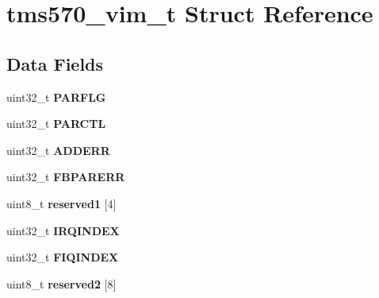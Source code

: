 \hypertarget{structtms570__vim__t}{}\section{tms570\+\_\+vim\+\_\+t Struct Reference}
\label{structtms570__vim__t}
\subsection*{Data Fields}
\begin{DoxyCompactItemize}
\item 
\mbox{\label{structtms570__vim__t_af6ecb90d837c1fb59de889a9f0ba4f7e}} 
uint32\+\_\+t {\bfseries P\+A\+R\+F\+LG}
\item 
\mbox{\label{structtms570__vim__t_aa5d4d86a929c2e2712c932b4393f8aa9}} 
uint32\+\_\+t {\bfseries P\+A\+R\+C\+TL}
\item 
\mbox{\label{structtms570__vim__t_aeb9362cfd7d48df80aaa450a7b174a51}} 
uint32\+\_\+t {\bfseries A\+D\+D\+E\+RR}
\item 
\mbox{\label{structtms570__vim__t_a0eec66f94e9a6b989fd0e632fb2f8849}} 
uint32\+\_\+t {\bfseries F\+B\+P\+A\+R\+E\+RR}
\item 
\mbox{\label{structtms570__vim__t_ab74f0be5f712112aa741fc7d9fec0da8}} 
uint8\+\_\+t {\bfseries reserved1} \mbox{[}4\mbox{]}
\item 
\mbox{\label{structtms570__vim__t_ac642bf544b38ad4d968565a292fdf159}} 
uint32\+\_\+t {\bfseries I\+R\+Q\+I\+N\+D\+EX}
\item 
\mbox{\label{structtms570__vim__t_a7072be9797b87b3e21851fd93982217c}} 
uint32\+\_\+t {\bfseries F\+I\+Q\+I\+N\+D\+EX}
\item 
\mbox{\label{structtms570__vim__t_a051063e5fb0a3899fc17adfb4524e005}} 
uint8\+\_\+t {\bfseries reserved2} \mbox{[}8\mbox{]}
\item 
\mbox{\label{structtms570__vim__t_a7230d1044ea6ce692d767b77e3adb0a3}} 

\end{DoxyCompactItemize}
